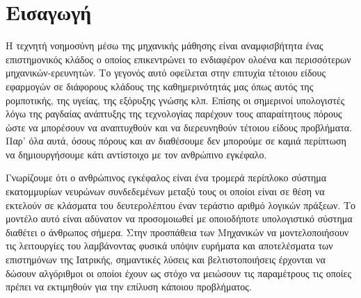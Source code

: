 
\chapter{Εισαγωγή}
\par Η τεχνητή νοημοσύνη μέσω της μηχανικής μάθησης είναι αναμφισβήτητα ένας επιστημονικός κλάδος ο οποίος επικεντρώνει το ενδιαφέρον ολοένα και περισσότερων μηχανικών-ερευνητών. Το γεγονός αυτό οφείλεται στην επιτυχία τέτοιου είδους εφαρμογών σε διάφορους κλάδους της καθημερινότητάς μας όπως αυτός της ρομποτικής, της υγείας, της εξόρυξης γνώσης κλπ. Επίσης οι σημερινοί υπολογιστές λόγω της ραγδαίας ανάπτυξης της τεχνολογίας παρέχουν τους απαραίτητους πόρους ώστε να μπορέσουν να αναπτυχθούν και να διερευνηθούν τέτοιου είδους προβλήματα. Παρ' όλα αυτά, όσους πόρους και αν διαθέσουμε δεν μπορούμε σε καμιά περίπτωση να δημιουργήσουμε κάτι αντίστοιχο με τον ανθρώπινο εγκέφαλο.
 
\par Γνωρίζουμε ότι ο ανθρώπινος εγκέφαλος είναι ένα τρομερά περίπλοκο σύστημα εκατομμυρίων νευρώνων συνδεδεμένων μεταξύ τους οι οποίοι είναι σε θέση να εκτελούν σε κλάσματα του δευτερολέπτου έναν τεράστιο αριθμό λογικών πράξεων. Το μοντέλο αυτό είναι αδύνατον να προσομοιωθεί με οποιοδήποτε υπολογιστικό σύστημα διαθέτει ο άνθρωπος σήμερα. Στην προσπάθεια των Μηχανικών να μοντελοποιήσουν τις λειτουργίες του λαμβάνοντας φυσικά υπόψιν ευρήματα και αποτελέσματα των επιστημόνων της Ιατρικής, σημαντικές λύσεις και βελτιστοποιήσεις έρχονται να δώσουν αλγόριθμοι οι οποίοι έχουν ως στόχο να μειώσουν τις παραμέτρους τις οποίες πρέπει να εκτιμηθούν για την επίλυση κάποιου προβλήματος.

